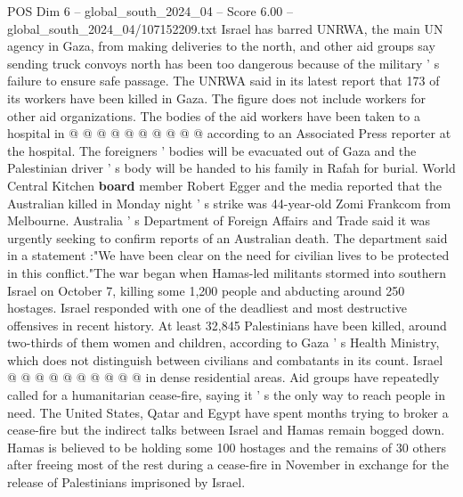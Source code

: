 \begin{textsample}{POS Dim 6 – global\_south\_2024\_04 – Score 6.00 – global\_south\_2024\_04/107152209.txt}
Israel has barred UNRWA, the main UN agency in Gaza, from making deliveries to the north, and other aid groups say sending truck convoys north has been too dangerous because of the military ' s failure to ensure safe passage.
The UNRWA said in its latest report that 173 of its workers have been killed in Gaza.
The figure does not include workers for other aid organizations.
The bodies of the aid workers have been taken to a hospital in @ @ @ @ @ @ @ @ @ @ according to an Associated Press reporter at the hospital.
The foreigners ' bodies will be evacuated out of Gaza and the Palestinian driver ' s body will be handed to his family in Rafah for burial.
World Central Kitchen \textbf{board} member Robert Egger and the media reported that the Australian killed in Monday night ' s strike was 44-year-old Zomi Frankcom from Melbourne.
Australia ' s Department of Foreign Affairs and Trade said it was urgently seeking to confirm reports of an Australian death.
The department said in a statement :"We have been clear on the need for civilian lives to be protected in this conflict."The war began when Hamas-led militants stormed into southern Israel on October 7, killing some 1,200 people and abducting around 250 hostages.
Israel responded with one of the deadliest and most destructive offensives in recent history.
At least 32,845 Palestinians have been killed, around two-thirds of them women and children, according to Gaza ' s Health Ministry, which does not distinguish between civilians and combatants in its count.
Israel @ @ @ @ @ @ @ @ @ @ in dense residential areas.
Aid groups have repeatedly called for a humanitarian cease-fire, saying it ' s the only way to reach people in need.
The United States, Qatar and Egypt have spent months trying to broker a cease-fire but the indirect talks between Israel and Hamas remain bogged down.
Hamas is believed to be holding some 100 hostages and the remains of 30 others after freeing most of the rest during a cease-fire in November in exchange for the release of Palestinians imprisoned by Israel.

\end{textsample}
